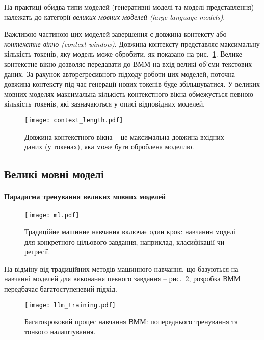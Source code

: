На практиці обидва типи моделей (генеративні моделі та моделі представлення) належать до категорії \emph{великих мовних моделей (large language models)}.

Важливою частиною цих моделей завершення є довжина контексту або \emph{контекстне вікно (context window)}. Довжина контексту представляє максимальну кількість токенів, яку модель може обробити, як показано на  рис.~\ref{fig:context_length}. Велике контекстне вікно дозволяє передавати до ВММ на вхід великі об'єми текстових даних. За рахунок авторегресивного підходу роботи цих моделей, поточна довжина контексту під час генерації нових токенів буде збільшуватися. У великих мовних моделях максимальна кількість контекстного вікна обмежується певною кількість токенів, які зазначаються у описі відповідних моделей.

\begin{figure}[h]
    \centering
    \texttt{[image: context\_length.pdf]}
    \caption{Довжина контекстного вікна -- це максимальна довжина вхідних даних (у токенах), яка може бути оброблена моделлю.}
    \label{fig:context_length}
\end{figure}

\subsection{Великі мовні моделі}

\paragraph{Парадигма тренування великих мовних моделей}

\begin{figure}[h]
    \centering
    \texttt{[image: ml.pdf]}
    \caption{Традиційне машинне навчання включає один крок: навчання моделі для конкретного цільового завдання, наприклад, класифікації чи регресії.}
    \label{fig:ml}
\end{figure}

На відміну від традиційних методів машинного навчання, що базуються на навчанні моделей для виконання певного завдання -- рис.~\ref{fig:ml}, розробка ВММ передбачає багатоступеневий підхід. 
\begin{figure}[h]
    \centering
    \texttt{[image: llm\_training.pdf]}
    \caption{Багатокроковий процес навчання ВММ: попереднього тренування та тонкого налаштування.}
    \label{fig:llm_training}
\end{figure}

